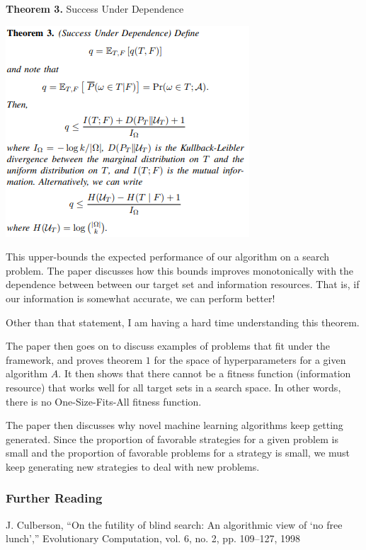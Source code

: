 \documentclass[12pt]{article}
\begin{document}
\bigskip

\textbf{Theorem 3.} Success Under Dependence
\begin{center}
    \includegraphics{FamineForte/SuccessUnderDependence.PNG}
\end{center}

This upper-bounds the expected performance of our algorithm on a search problem. The paper discusses how this bounds improves monotonically with the dependence between between our target set and information resources. That is, if our information is somewhat accurate, we can perform better! 

Other than that statement, I am having a hard time understanding this theorem. 


\bigskip

The paper then goes on to discuss examples of problems that fit under the framework, and proves theorem $1$ for the space of hyperparameters for a given algorithm $A$. It then shows that there cannot be a fitness function (information resource) that works well for all target sets in a search space. In other words, there is no One-Size-Fits-All fitness function. 

\bigskip

The paper then discusses why novel machine learning algorithms keep getting generated. Since the proportion of favorable strategies for a given problem is small and the proportion of favorable problems for a strategy is small, we must keep generating new strategies to deal with new problems.  

\subsubsection*{Further Reading} 

J. Culberson, “On the futility of blind search: An algorithmic view of
‘no free lunch’,” Evolutionary Computation, vol. 6, no. 2, pp. 109–127,
1998
\end{document}
